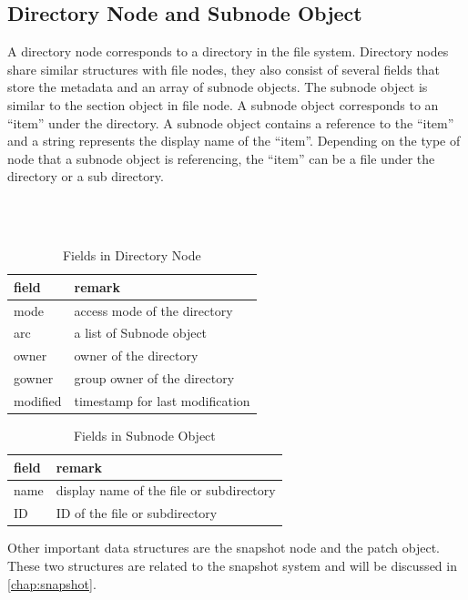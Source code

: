 \subsection{Directory Node and Subnode Object}

     A directory node corresponds to a directory in the file system. Directory nodes share similar structures with file nodes, they also consist of several fields that store the metadata and an array of subnode objects. The subnode object is similar to the section object in file node. A subnode object corresponds to an ``item'' under the directory. A subnode object contains a reference to the ``item'' and a string represents the display name of the ``item''. Depending on the type of node that a subnode object is referencing, the ``item'' can be a file under the directory or a sub directory.

\begin{table}[t]
\begin{center}
~\\
~\\
\caption{Fields in Directory Node}
\begin{tabular}{ll}
\toprule
field & remark\\
\midrule
mode & access mode of the directory\\
arc & a list of Subnode object\\
owner & owner of the directory\\
gowner & group owner of the directory\\
modified & timestamp for last modification\\
\bottomrule
\end{tabular}
\end{center}
\label{tab:dir_fields}
\end{table}

\begin{table}[t]
\begin{center}
\caption{Fields in Subnode Object}
\begin{tabular}{ll}
\toprule
field & remark\\
\midrule
name & display name of the file or subdirectory\\
ID & ID of the file or subdirectory\\
\bottomrule
\end{tabular}
\end{center}
\label{tab:subnode_fields}
\end{table}

    Other important data structures are the snapshot node and the patch object. These two structures are related to the snapshot system and will be discussed in \cref{chap:snapshot}.

